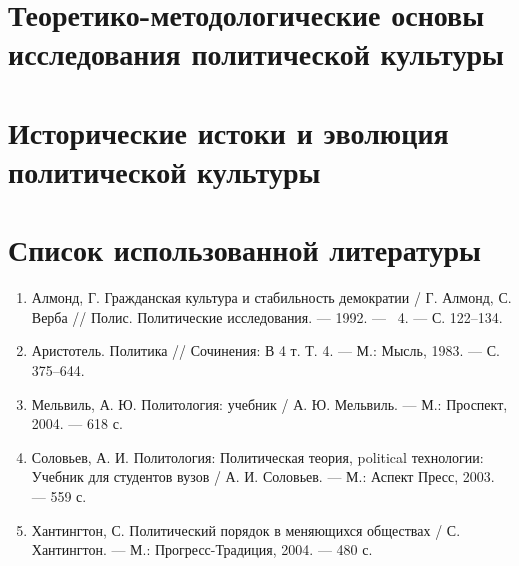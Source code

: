 \documentclass[a4paper, 14pt]{extarticle}
\begin{document}
\setcounter{page}{2}

\tableofcontents
\newpage


\newpage

\section{Теоретико-методологические основы исследования политической культуры}



\newpage

\section{Исторические истоки и эволюция политической культуры}



\newpage



\newpage
\section*{Список использованной литературы}

\begin{enumerate}
    \item Алмонд, Г. Гражданская культура и стабильность демократии / Г. Алмонд, С. Верба // Полис. Политические исследования. --- 1992. --- \textnumero~4. --- С. 122–134.
    \item Аристотель. Политика // Сочинения: В 4 т. Т. 4. --- М.: Мысль, 1983. --- С. 375–644.
    \item Мельвиль, А. Ю. Политология: учебник / А. Ю. Мельвиль. --- М.: Проспект, 2004. --- 618 с.
    \item Соловьев, А. И. Политология: Политическая теория, political технологии: Учебник для студентов вузов / А. И. Соловьев. --- М.: Аспект Пресс, 2003. --- 559 с.
    \item Хантингтон, С. Политический порядок в меняющихся обществах / С. Хантингтон. --- М.: Прогресс-Традиция, 2004. --- 480 с.
\end{enumerate}
\end{document}
